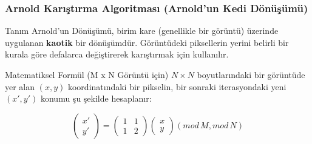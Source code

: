 \documentclass[aspectratio=169,xcolor={dvipsnames}]{beamer}
\begin{document}
\begin{frame}
    \frametitle{Arnold Karıştırma Algoritması (Arnold'un Kedi Dönüşümü)}

    \begin{block}{Tanım}
        Arnold'un Dönüşümü, birim kare (genellikle bir görüntü) üzerinde uygulanan \textbf{kaotik} bir dönüşümdür. Görüntüdeki piksellerin yerini belirli bir kurala göre defalarca değiştirerek karıştırmak için kullanılır.
    \end{block}

    \begin{block}{Matematiksel Formül (M x N Görüntü için)}
        $N \times N$ boyutlarındaki bir görüntüde yer alan $(x, y)$ koordinatındaki bir pikselin, bir sonraki iterasyondaki yeni $(x', y')$ konumu şu şekilde hesaplanır:

        $$
        \begin{pmatrix} x' \\ y' \end{pmatrix} = 
        \begin{pmatrix} 1 & 1 \\ 1 & 2 \end{pmatrix} 
        \begin{pmatrix} x \\ y \end{pmatrix} (mod\, M, mod\, N)
        $$
    \end{block}

\end{frame} %
\end{document}
